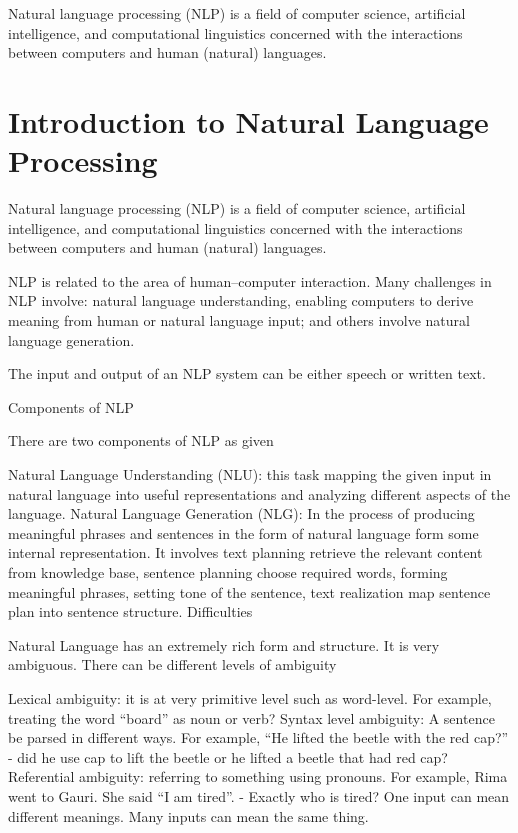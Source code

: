 Natural language processing (NLP) is a field of computer science, artificial intelligence, and computational linguistics concerned with the interactions between computers and human (natural) languages.

\section{Introduction to Natural Language Processing}

Natural language processing (NLP) is a field of computer science, artificial intelligence, and computational linguistics concerned with the interactions between computers and human (natural) languages.

NLP is related to the area of human–computer interaction. Many challenges in NLP involve: natural language understanding, enabling computers to derive meaning from human or natural language input; and others involve natural language generation.

The input and output of an NLP system can be either speech or written text.

Components of NLP

There are two components of NLP as given

Natural Language Understanding (NLU): this task mapping the given input in natural language into useful representations and analyzing different aspects of the language.
Natural Language Generation (NLG): In the process of producing meaningful phrases and sentences in the form of natural language form some internal representation. It involves text planning retrieve the relevant content from knowledge base, sentence planning choose required words, forming meaningful phrases, setting tone of the sentence, text realization map sentence plan into sentence structure.
Difficulties

Natural Language has an extremely rich form and structure. It is very ambiguous. There can be different levels of ambiguity

Lexical ambiguity: it is at very primitive level such as word-level. For example, treating the word “board” as noun or verb?
Syntax level ambiguity: A sentence be parsed in different ways. For example, “He lifted the beetle with the red cap?” - did he use cap to lift the beetle or he lifted a beetle that had red cap?
Referential ambiguity: referring to something using pronouns. For example, Rima went to Gauri. She said “I am tired”. - Exactly who is tired?
One input can mean different meanings.
Many inputs can mean the same thing.

